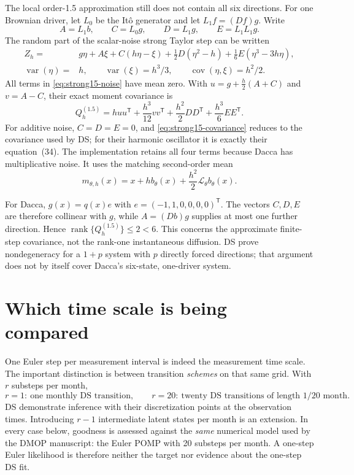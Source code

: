 \documentclass[11pt]{article}
\newcommand{\rank}{\operatorname{rank}}
\begin{document}
The local order-1.5 approximation still does not contain all six directions.
For one Brownian driver, let $L_0$ be the It\^o generator and let
$L_1f=(Df)g$.  Write
\[
 A=L_1b,\qquad C=L_0g,\qquad D=L_1g,\qquad E=L_1L_1g.
\]
The random part of the scalar-noise strong Taylor step can be written
\begin{align}
 Z_h={}&g\eta+A\xi+C(h\eta-\xi)
       +\tfrac12D(\eta^2-h)+\tfrac16E(\eta^3-3h\eta),\label{eq:strong15-noise}\\
 \operatorname{var}(\eta)={}&h,\qquad
 \operatorname{var}(\xi)=h^3/3,\qquad
 \operatorname{cov}(\eta,\xi)=h^2/2.
\end{align}
All terms in \eqref{eq:strong15-noise} have mean zero.  With
$u=g+\tfrac h2(A+C)$ and $v=A-C$, their exact moment covariance is
\begin{equation}
 Q_h^{(1.5)}=huu^\mathsf T+\frac{h^3}{12}vv^\mathsf T
 +\frac{h^2}{2}DD^\mathsf T+\frac{h^3}{6}EE^\mathsf T.
 \label{eq:strong15-covariance}
\end{equation}
For additive noise, $C=D=E=0$, and \eqref{eq:strong15-covariance}
reduces to the covariance used by DS; for their harmonic oscillator it is
exactly their equation~(34).  The implementation retains all four terms
because Dacca has multiplicative noise.  It uses the matching second-order
mean
\[
 m_{\theta,h}(x)=x+h b_\theta(x)+\frac{h^2}{2}\mathcal L_\theta
 b_\theta(x).
\]

For Dacca, $g(x)=q(x)e$ with
$e=(-1,1,0,0,0,0)^\mathsf T$.  The vectors $C,D,E$ are therefore collinear
with $g$, while $A=(Db)g$ supplies at most one further direction.  Hence
$\rank\{Q_h^{(1.5)}\}\leq2<6$.  This concerns the approximate finite-step
covariance, not the rank-one instantaneous diffusion.  DS prove
nondegeneracy for a $1+p$ system with $p$ directly forced directions; that
argument does not by itself cover Dacca's six-state, one-driver system.

\section{Which time scale is being compared}

One Euler step per measurement interval is indeed the measurement time scale.
The important distinction is between transition \emph{schemes} on that same
grid.  With $r$ substeps per month,
\[
 r=1:\ \text{one monthly DS transition},\qquad
 r=20:\ \text{twenty DS transitions of length $1/20$ month}.
\]
DS demonstrate inference with their discretization points at the observation
times.  Introducing $r-1$ intermediate latent states per month is an extension.
In every case below, goodness is assessed against the \emph{same} numerical
model used by the DMOP manuscript: the Euler POMP with 20 substeps per month.
A one-step Euler likelihood is therefore neither the target nor evidence about
the one-step DS fit.
\end{document}
